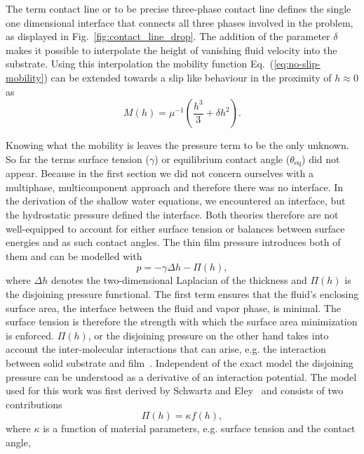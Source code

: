 The term contact line or to be precise three-phase contact line defines the single one dimensional interface that connects all three phases involved in the problem, as displayed in Fig.~\ref{fig:contact_line_drop}.
The addition of the parameter $\delta$ makes it possible to interpolate the height of vanishing fluid velocity into the substrate.
Using this interpolation the mobility function Eq.~(\ref{eq:no-slip-mobility}) can be extended towards a slip like behaviour in the proximity of $h\approx 0$ as
\begin{equation}\label{eq:slip_mobility}
    M(h) = \mu^{-1}\left(\frac{h^3}{3} + \delta h^2\right).
\end{equation}

Knowing what the mobility is leaves the pressure term to be the only unknown.
So far the terms surface tension ($\gamma$) or equilibrium contact angle ($\theta_{\text{eq}}$) did not appear.
Because in the first section we did not concern ourselves with a multiphase, multicomponent approach and therefore there was no interface.
In the derivation of the shallow water equations, we encountered an interface, but the hydrostatic pressure defined the interface.
Both theories therefore are not well-equipped to account for either surface tension or balances between surface energies and as such contact angles.
The thin film pressure introduces both of them and can be modelled with
\begin{equation}\label{eq:thin_film_pressure}
    p = -\gamma \Delta h - \Pi(h),
\end{equation}
where $\Delta h$ denotes the two-dimensional Laplacian of the thickness and $\Pi(h)$ is the disjoining pressure functional.
The first term ensures that the fluid's enclosing surface area, the interface between the fluid and vapor phase, is minimal.
The surface tension is therefore the strength with which the surface area minimization is enforced.
$\Pi(h)$, or the disjoining pressure on the other hand takes into account the inter-molecular interactions that can arise, e.g. the interaction between solid substrate and film~\cite{RevModPhys.81.1131, moulton_lega_2013}.
Independent of the exact model the disjoining pressure can be understood as a derivative of an interaction potential.
The model used for this work was first derived by Schwartz and Eley~\cite{SCHWARTZ1998173} and consists of two contributions
\begin{equation}\label{eq:disj_pressure_one}
    \Pi(h) = \kappa f(h),
\end{equation}
where $\kappa$ is a function of material parameters, e.g. surface tension and the contact angle, 
